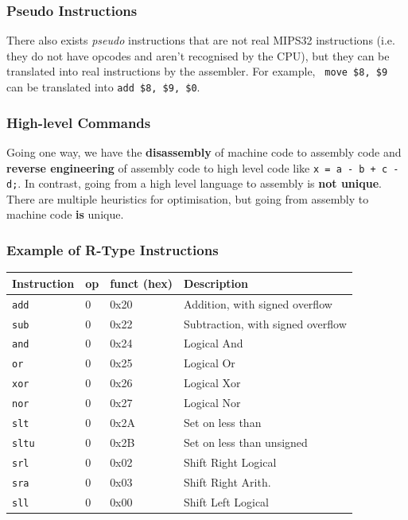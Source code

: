\documentclass[a4paper, 11pt]{article}
\theoremstyle{definition}
\begin{document}
\subsubsection{Pseudo Instructions}
There also exists \textit{pseudo} instructions that are not real MIPS32 instructions (i.e. they do not have opcodes and
aren't recognised by the CPU), but they can be translated into real instructions by the assembler. For example, \texttt{
move \$8, \$9} can be translated into \texttt{add \$8, \$9, \$0}.

\subsubsection{High-level Commands}
Going one way, we have the \textbf{disassembly} of machine code to assembly code and \textbf{reverse engineering} of
assembly code to high level code like \texttt{x = a - b + c - d;}. In contrast, going from a high level language to 
assembly is \textbf{not unique}. There are multiple heuristics for optimisation, but going from assembly to machine code
\textbf{is} unique.

\subsubsection{Example of \textbf{R}-Type Instructions}
\begin{center}
\begin{tabular}{|llll|}
    \hline
    Instruction & op & funct (hex) & Description \\
    \hline
    \texttt{add}  & 0 & 0x20 & Addition, with signed overflow \\
    \texttt{sub}  & 0 & 0x22 & Subtraction, with signed overflow \\
    \texttt{and}  & 0 & 0x24 & Logical And \\
    \texttt{or}   & 0 & 0x25 & Logical Or \\
    \texttt{xor}  & 0 & 0x26 & Logical Xor \\
    \texttt{nor}  & 0 & 0x27 & Logical Nor \\
    \texttt{slt}  & 0 & 0x2A & Set on less than \\
    \texttt{sltu} & 0 & 0x2B & Set on less than unsigned \\
    \texttt{srl}  & 0 & 0x02 & Shift Right Logical \\
    \texttt{sra}  & 0 & 0x03 & Shift Right Arith. \\
    \texttt{sll}  & 0 & 0x00 & Shift Left Logical \\
    \hline
\end{tabular}
\end{center}
\end{document}

